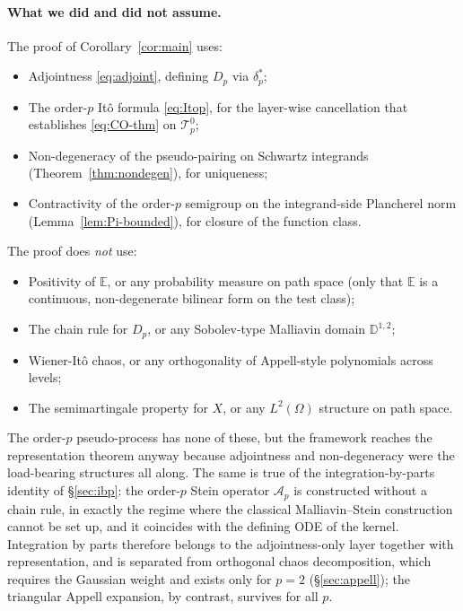 \documentclass[11pt,reqno]{amsart}
\theoremstyle{plain}
\theoremstyle{definition}
\newcommand{\E}{\mathbb{E}}
\begin{document}
\paragraph{What we did and did not assume.}
The proof of Corollary~\ref{cor:main} uses:
\begin{itemize}
\item Adjointness \eqref{eq:adjoint}, defining $D_p$ via $\delta_p^*$;
\item The order-$p$ Itô formula \eqref{eq:Itop}, for the layer-wise cancellation that establishes \eqref{eq:CO-thm} on $\mathcal{T}_p^0$;
\item Non-degeneracy of the pseudo-pairing on Schwartz integrands (Theorem~\ref{thm:nondegen}), for uniqueness;
\item Contractivity of the order-$p$ semigroup on the integrand-side Plancherel norm (Lemma~\ref{lem:Pi-bounded}), for closure of the function class.
\end{itemize}

The proof does \emph{not} use:
\begin{itemize}
\item Positivity of $\E$, or any probability measure on path space (only that $\E$ is a continuous, non-degenerate bilinear form on the test class);
\item The chain rule for $D_p$, or any Sobolev-type Malliavin domain $\mathbb{D}^{1,2}$;
\item Wiener-Itô chaos, or any orthogonality of Appell-style polynomials across levels;
\item The semimartingale property for $X$, or any $L^2(\Omega)$ structure on path space.
\end{itemize}

The order-$p$ pseudo-process has none of these, but the framework reaches the representation theorem anyway because adjointness and non-degeneracy were the load-bearing structures all along. The same is true of the integration-by-parts identity of \S\ref{sec:ibp}: the order-$p$ Stein operator $\mathcal{A}_p$ is constructed without a chain rule, in exactly the regime where the classical Malliavin--Stein construction cannot be set up, and it coincides with the defining ODE of the kernel. Integration by parts therefore belongs to the adjointness-only layer together with representation, and is separated from orthogonal chaos decomposition, which requires the Gaussian weight and exists only for $p=2$ (\S\ref{sec:appell}); the triangular Appell expansion, by contrast, survives for all $p$.
\end{document}
